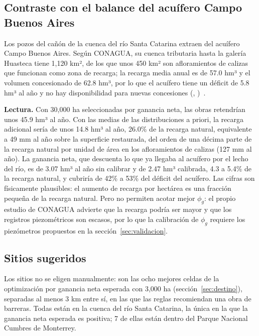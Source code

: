 \documentclass[11pt,letterpaper]{article}
\makeatletter
\newcommand{\citap}[1]{(\@nameuse{cautor@#1}, \@nameuse{canio@#1})~\cite{#1}}
\newcommand{\lectura}[1]{\par\noindent\textcolor{naranja}{\textbf{Lectura.}} #1\par}
\makeatother
\begin{document}
\subsection{Contraste con el balance del acuífero Campo Buenos Aires}\label{res:acuifero}

Los pozos del cañón de la cuenca del río Santa Catarina extraen del acuífero Campo Buenos Aires. Según CONAGUA, su cuenca tributaria hasta la galería Huasteca tiene 1,120 km², de los que unos 450 km² son afloramientos de calizas que funcionan como zona de recarga; la recarga media anual es de 57.0 hm³ y el volumen concesionado de 62.8 hm³, por lo que el acuífero tiene un déficit de 5.8 hm³ al año y no hay disponibilidad para nuevas concesiones \citap{conagua_cba}.

\lectura{Con 30,000 ha seleccionadas por ganancia neta, las obras retendrían unos 45.9 hm³ al año. Con las medias de las distribuciones a priori, la recarga adicional sería de unos 14.8 hm³ al año, 26.0\% de la recarga natural, equivalente a 49 mm al año sobre la superficie restaurada, del orden de una décima parte de la recarga natural por unidad de área en los afloramientos de calizas (127 mm al año). La ganancia neta, que descuenta lo que ya llegaba al acuífero por el lecho del río, es de 3.07 hm³ al año sin calibrar y de 2.47 hm³ calibrada, 4.3 a 5.4\% de la recarga natural, y cubriría de 42\% a 53\% del déficit del acuífero. Las cifras son físicamente plausibles: el aumento de recarga por hectárea es una fracción pequeña de la recarga natural. Pero no permiten acotar mejor $\phi_g$: el propio estudio de CONAGUA advierte que la recarga podría ser mayor y que los registros piezométricos son escasos, por lo que la calibración de $\phi_g$ requiere los piezómetros propuestos en la sección~\ref{sec:validacion}.}

\subsection{Sitios sugeridos}

Los sitios no se eligen manualmente: son las ocho mejores celdas de la optimización por ganancia neta esperada con 3,000 ha (sección~\ref{sec:destino}), separadas al menos 3 km entre sí, en las que las reglas recomiendan una obra de barreras. Todas están en la cuenca del río Santa Catarina, la única en la que la ganancia neta esperada es positiva; 7 de ellas están dentro del Parque Nacional Cumbres de Monterrey.
\end{document}
